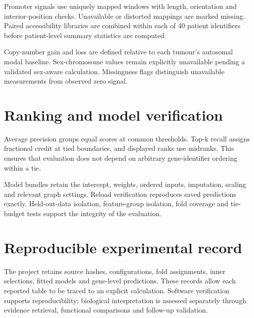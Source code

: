 \documentclass[12pt,a4paper,oneside]{report}
\begin{document}
Promoter signals use uniquely mapped windows with length, orientation and interior-position checks. Unavailable or distorted mappings are marked missing. Paired accessibility libraries are combined within each of 40 patient identifiers before patient-level summary statistics are computed.

Copy-number gain and loss are defined relative to each tumour's autosomal modal baseline. Sex-chromosome values remain explicitly unavailable pending a validated sex-aware calculation. Missingness flags distinguish unavailable measurements from observed zero signal.

\section{Ranking and model verification}
Average precision groups equal scores at common thresholds. Top-k recall assigns fractional credit at tied boundaries, and displayed ranks use midranks. This ensures that evaluation does not depend on arbitrary gene-identifier ordering within a tie.

Model bundles retain the intercept, weights, ordered inputs, imputation, scaling and relevant graph settings. Reload verification reproduces saved predictions exactly. Held-out-data isolation, feature-group isolation, fold coverage and tie-budget tests support the integrity of the evaluation.

\section{Reproducible experimental record}
The project retains source hashes, configurations, fold assignments, inner selections, fitted models and gene-level predictions. These records allow each reported table to be traced to an explicit calculation. Software verification supports reproducibility; biological interpretation is assessed separately through evidence retrieval, functional comparisons and follow-up validation.
\end{document}
